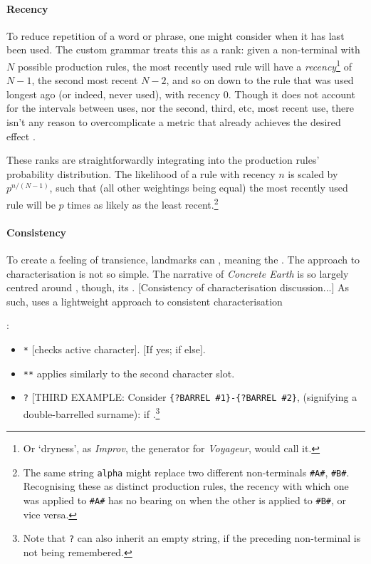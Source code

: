 \documentclass[a4paper, 11pt]{article}
\begin{document}
\begin{flushleft}
\paragraph{Recency} To reduce repetition of a word or phrase, one might consider when it has last been used. The custom grammar treats this as a rank: given a non-terminal with $N$ possible production rules, the most recently used rule will have a \textit{recency}\footnote{Or `dryness', as \textit{Improv}, the generator for \textit{Voyageur}, would call it.} of $N-1$, the second most recent $N-2$, and so on down to the rule that was used longest ago (or indeed, never used), with recency $0$. Though it does not account for the intervals between uses, nor the second, third, etc, most recent use, there isn't any reason to overcomplicate a metric that already achieves the desired effect \citep{kazemiSimpleProceduralGeneration}.

\vspace{5pt}\noindent
These ranks are straightforwardly integrating into the production rules' probability distribution. The likelihood of a rule with recency $n$ is scaled by $p^{n/(N-1)}$, such that (all other weightings being equal) the most recently used rule will be $p$ times as likely as the least recent.\footnote{The same string \texttt{alpha} might replace two different non-terminals \texttt{\#A\#}, \texttt{\#B\#}. Recognising these as distinct production rules, the recency with which one was applied to \texttt{\#A\#} has no bearing on when the other is applied to \texttt{\#B\#}, or vice versa.} 


\paragraph{Consistency} To create a feeling of transience, landmarks can , meaning the . The approach to characterisation is not so simple. The narrative of \textit{Concrete Earth} is so largely centred around , though, its  . [Consistency of characterisation discussion...] As such,  uses a lightweight approach to consistent characterisation

\vspace{5pt}:
\begin{itemize}[noitemsep]
\item \verb|*| [checks active character]. [If yes; if else].
\item \verb|**| applies similarly to the second character slot.
\item \verb|?| [THIRD EXAMPLE: Consider \verb|{?BARREL #1}-{?BARREL #2}|, (signifying a double-barrelled surname): if .\footnote{Note that \texttt{?} can also inherit an empty string, if the preceding non-terminal is not being remembered.}
\end{itemize}




\end{flushleft}
\end{document}
